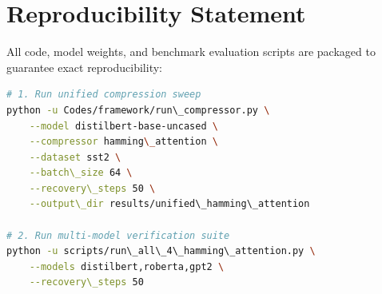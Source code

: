 \section{Reproducibility Statement}
All code, model weights, and benchmark evaluation scripts are packaged to guarantee exact reproducibility:
\begin{lstlisting}[language=bash]
# 1. Run unified compression sweep
python -u Codes/framework/run\_compressor.py \
    --model distilbert-base-uncased \
    --compressor hamming\_attention \
    --dataset sst2 \
    --batch\_size 64 \
    --recovery\_steps 50 \
    --output\_dir results/unified\_hamming\_attention

# 2. Run multi-model verification suite
python -u scripts/run\_all\_4\_hamming\_attention.py \
    --models distilbert,roberta,gpt2 \
    --recovery\_steps 50
\end{lstlisting}

